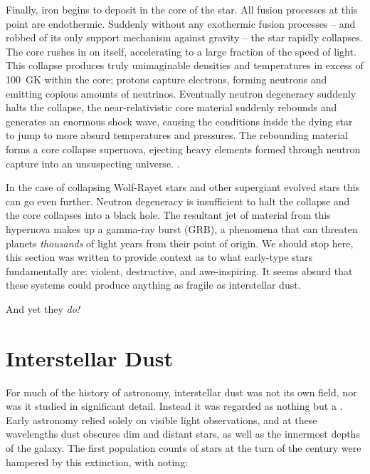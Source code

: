 Finally, iron begins to deposit in the core of the star.
All fusion processes at this point are endothermic.
Suddenly without any exothermic fusion processes -- and robbed of its only support mechanism against gravity -- the star rapidly collapses.
The core rushes in on itself, accelerating to a large fraction of the speed of light.
This collapse produces truly unimaginable densities and temperatures in excess of \SI{100}{\giga\kelvin} within the core; protons capture electrons, forming neutrons and emitting copious amounts of neutrinos.
Eventually neutron degeneracy suddenly halts the collapse, the near-relativistic core material suddenly rebounds and generates an enormous shock wave, causing the conditions inside the dying star to jump to more absurd temperatures and pressures.
The rebounding material forms a core collapse supernova, ejecting heavy elements formed through neutron capture into an unsuspecting universe.
 .

In the case of collapsing Wolf-Rayet stars and other supergiant evolved stars this can go even further.
Neutron degeneracy is insufficient to halt the collapse and the core collapses into a black hole.
The resultant jet of material from this hypernova makes up a gamma-ray burst (GRB), a phenomena that can threaten planets \emph{thousands} of light years from their point of origin.
We should stop here, this section was written to provide context as to what early-type stars fundamentally are: violent, destructive, and awe-inspiring.
It seems absurd that these systems could produce anything as fragile as interstellar dust.

\begin{center}
  And yet they \emph{do!}
\end{center}

\section{Interstellar Dust}
\label{sec:dust}

For much of the history of astronomy, interstellar dust was not its own field, nor was it studied in significant detail.
Instead it was regarded as nothing but a .
Early astronomy relied solely on visible light observations, and at these wavelengths dust obscures dim and distant stars, as well as the innermost depths of the galaxy.
The first population counts of stars at the turn of the  century were hampered by this extinction, with \textcite{kapteynAbsorptionLightSpace1909} noting:

